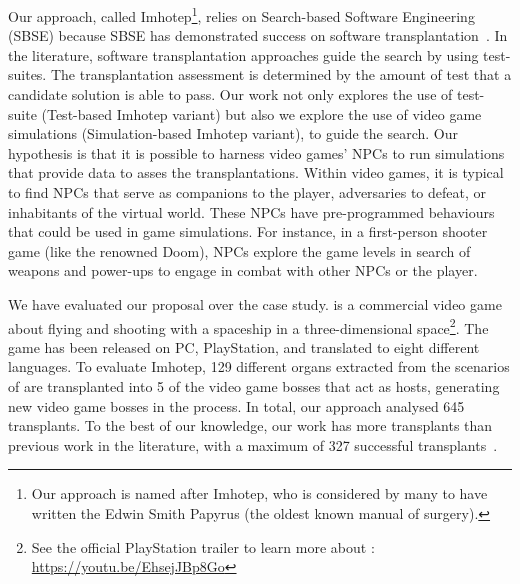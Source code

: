 
Our approach, called Imhotep\footnote{Our approach is named after Imhotep, who is considered by many to have written the Edwin Smith Papyrus (the oldest known manual of surgery).}, relies on Search-based Software Engineering (SBSE) because SBSE has demonstrated success on software transplantation~\cite{barr2015automated}. In the literature, software transplantation approaches guide the search by using test-suites. The transplantation assessment is determined by the amount of test that a candidate solution is able to pass. Our work not only explores the use of test-suite (Test-based Imhotep variant) but also we explore the use of video game simulations (Simulation-based Imhotep variant), to guide the search.  Our hypothesis is that it is possible to harness video games' NPCs to run simulations that provide data to asses the transplantations. Within video games, it is typical to find NPCs that serve as companions to the player, adversaries to defeat, or inhabitants of the virtual world. These NPCs have pre-programmed behaviours that could be used in game simulations. For instance, in a first-person shooter game (like the renowned Doom), NPCs explore the game levels in search of weapons and power-ups to engage in combat with other NPCs or the player.

We have evaluated our proposal over the \CaseStudy{} case study. \CaseStudy{} is a commercial video game about flying and shooting with a spaceship in a three-dimensional space\footnote{See the official PlayStation trailer to learn more about \CaseStudy{}: \url{https://youtu.be/EhsejJBp8Go}}. The game has been released on PC, PlayStation, and translated to eight different languages.
To evaluate Imhotep, 129 different organs extracted from the scenarios of \CaseStudy{} are transplanted into 5 of the video game bosses that act as hosts, generating new video game bosses in the process. 
In total, our approach analysed 645 transplants. To the best of our knowledge, our work has more transplants than previous work in the literature, with a maximum of 327 successful transplants~\cite{reid2020optimising}.

